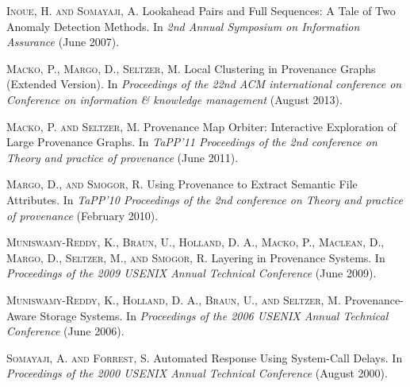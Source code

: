 \documentclass[10pt,twocolumn]{article}
\begin{document}
\begin{thebibliography}{99}

\textsc{Inoue, H. and Somayaji, A.} Lookahead Pairs and Full Sequences: A Tale of Two Anomaly Detection Methods. In {\em 2nd Annual Symposium on Information Assurance} (June 2007). 

\textsc{Macko, P., Margo, D., Seltzer, M.} Local Clustering in Provenance Graphs (Extended Version). In {\em Proceedings of the 22nd ACM international conference on Conference on information \& knowledge management} (August 2013).

\textsc{Macko, P. and Seltzer, M.} Provenance Map Orbiter: Interactive Exploration of Large Provenance Graphs. In {\em TaPP'11 Proceedings of the 2nd conference on Theory and practice of provenance} (June 2011).

\textsc{Margo, D., and Smogor, R.} Using Provenance to Extract Semantic File Attributes. In {\em TaPP'10 Proceedings of the 2nd conference on Theory and practice of provenance} (February 2010).

\textsc{Muniswamy-Reddy, K., Braun, U., Holland, D. A., Macko, P., Maclean, D., Margo, D., Seltzer, M., and Smogor, R.} Layering in Provenance Systems. In {\em Proceedings of the 2009 USENIX Annual Technical Conference} (June 2009).

\textsc{Muniswamy-Reddy, K., Holland, D. A., Braun, U., and Seltzer, M.} Provenance-Aware Storage Systems. In {\em Proceedings of the 2006 USENIX Annual Technical Conference} (June 2006).

\textsc{Somayaji, A. and Forrest, S.} Automated Response Using System-Call Delays. In {\em Proceedings of the 2000 USENIX Annual Technical Conference} (August 2000).

\end{thebibliography}
\end{document}

